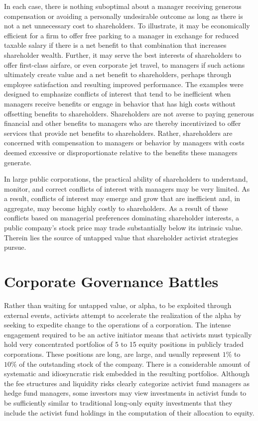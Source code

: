 \documentclass[11pt]{article}
\begin{document}
In each case, there is nothing suboptimal about a manager receiving generous compensation or avoiding a personally undesirable outcome as long as there is not a net unnecessary cost to shareholders. To illustrate, it may be economically efficient for a firm to offer free parking to a manager in exchange for reduced taxable salary if there is a net benefit to that combination that increases shareholder wealth. Further, it may serve the best interests of shareholders to offer first-class airfare, or even corporate jet travel, to managers if such actions ultimately create value and a net benefit to shareholders, perhaps through employee satisfaction and resulting improved performance. The examples were designed to emphasize conflicts of interest that tend to be inefficient when managers receive benefits or engage in behavior that has high costs without offsetting benefits to shareholders. Shareholders are not averse to paying generous financial and other benefits to managers who are thereby incentivized to offer services that provide net benefits to shareholders. Rather, shareholders are concerned with compensation to managers or behavior by managers with costs deemed excessive or disproportionate relative to the benefits these managers generate.

In large public corporations, the practical ability of shareholders to understand, monitor, and correct conflicts of interest with managers may be very limited. As a result, conflicts of interest may emerge and grow that are inefficient and, in aggregate, may become highly costly to shareholders. As a result of these conflicts based on managerial preferences dominating shareholder interests, a public company's stock price may trade substantially below its intrinsic value. Therein lies the source of untapped value that shareholder activist strategies pursue.

\section*{Corporate Governance Battles}
Rather than waiting for untapped value, or alpha, to be exploited through external events, activists attempt to accelerate the realization of the alpha by seeking to expedite change to the operations of a corporation. The intense engagement required to be an active initiator means that activists must typically hold very concentrated portfolios of 5 to 15 equity positions in publicly traded corporations. These positions are long, are large, and usually represent $1 \%$ to $10 \%$ of the outstanding stock of the company. There is a considerable amount of systematic and idiosyncratic risk embedded in the resulting portfolios. Although the fee structures and liquidity risks clearly categorize activist fund managers as hedge fund managers, some investors may view investments in activist funds to be sufficiently similar to traditional long-only equity investments that they include the activist fund holdings in the computation of their allocation to equity.
\end{document}
